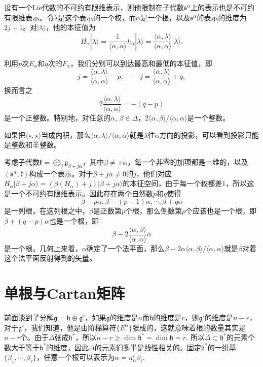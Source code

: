 \documentclass[9pt]{extarticle}
\newcommand{\lag}{{\mathfrak{g}}}
\begin{document}
\para 设有一个Lie代数的不可约有限维表示，则他限制在子代数$\mathfrak{s}^\alpha$上的表示也是不可约有限维表示。令$\lambda$是这个表示的一个权，而$\alpha$是一个根，以及$\mathfrak{s}^\alpha$的表示的维度为$2j+1$。对$|\lambda\rangle$，他的本征值为
\[
	H_\alpha|\lambda\rangle = \frac{1}{\langle \alpha,\alpha \rangle}h_\alpha|\lambda\rangle=\frac{\langle\alpha,\lambda\rangle}{\langle \alpha,\alpha \rangle}|\lambda\rangle.
\]

利用$p$次$E_\alpha$和$q$次的$F_\alpha$，我们分别可以到达最高和最低的本征值，即
\[
	j =\frac{\langle\alpha,\lambda\rangle}{\langle \alpha,\alpha \rangle}-p,\quad -j=\frac{\langle\alpha,\lambda\rangle}{\langle \alpha,\alpha \rangle}+q,
\]
换而言之
\[
	2\frac{\langle\alpha,\lambda\rangle}{\langle \alpha,\alpha\rangle}=-(q-p)
\]
是一个正整数。特别地，对任意的$\alpha$, $\beta\in \Delta$，$2\langle \alpha,\beta \rangle/\langle \alpha,\alpha \rangle$是一个整数。

如果把$\langle \star,\star \rangle$当成内积，那么$\langle \alpha,\lambda \rangle/\langle \alpha,\alpha \rangle$就是$\lambda$往$\alpha$方向的投影，可以看到投影只能是整数和半整数。

\para 考虑子代数$\mathfrak{k}=\bigoplus_j\lag_{\beta+j\alpha}$，其中$\beta\neq \pm \alpha$，每一个非零的加项都是一维的，以及$(\mathfrak{s}^\alpha,\mathfrak{k})$构成一个表示。对于$\beta+j\alpha\neq 0$的$j$，他们对应$H_\alpha|\beta+j\alpha\rangle =(\beta(H_\alpha)+j)|\beta+j\alpha\rangle$的本征空间，由于每一个权都差$1$，所以这是一个不可约有限维表示。因此存在两个自然数$p$和$q$使得
\[
	\beta-p\alpha,\beta-(p-1)\alpha,\cdots,\beta+q\alpha
\]
是一列根，在这列根之中，$\beta$是正数第$p$个根，那么倒数第$p$个应该也是一个根，即$\beta+(q-p)\alpha$也是一个根，即
\[
	\beta-2\frac{\langle \alpha,\beta \rangle}{\langle \alpha,\alpha \rangle}\alpha
\]
是一个根。几何上来看，$\alpha$确定了一个法平面，那么$\beta-2\alpha\langle \alpha,\beta \rangle/\langle \alpha,\alpha \rangle$就是$\beta$对着这个法平面反射得到的矢量。

\section{单根与Cartan矩阵}

\para 前面谈到了分解$\lag=\mathfrak{h}\oplus \lag'$，如果$\lag$的维度是$n$而$\mathfrak{h}$的维度是$r$，则$\lag'$的维度是$n-r$，对于$\lag'$，我们知道，他是由阶梯算符$\{E^\alpha\}$张成的，这就意味着根的数量其实是$n-r$个。由于$\Delta$张成$\mathfrak{h}^*$，所以$n-r\geq\dim \mathfrak{h}^*=\dim \mathfrak{h}=r$. 所以$\Delta\subset \mathfrak{h}^*$的元素个数大于等于$\mathfrak{h}^*$的维度，因此$\Delta$的元素们多半是线性相关的。固定$\mathfrak{h}^*$的一组基$\{\beta_1,\cdots,\beta_r\}$，任意一个根可以表示为$\alpha=n^i_\alpha\beta_i$.
\end{document}
